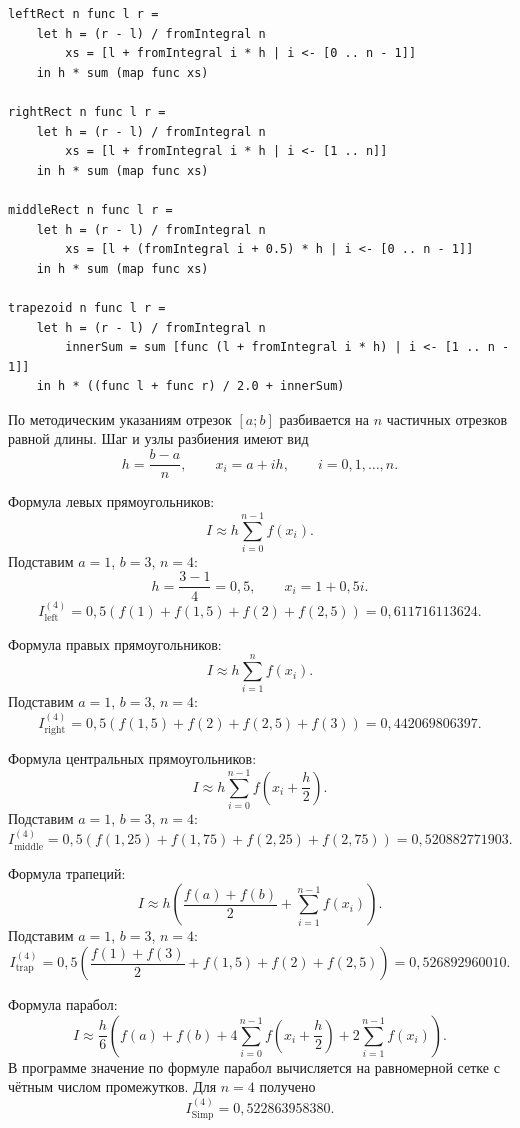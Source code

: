 \documentclass[14pt,a4paper]{extarticle}
\begin{document}
\begin{lstlisting}[caption={Фрагмент кода простейших квадратурных формул}]
leftRect n func l r =
    let h = (r - l) / fromIntegral n
        xs = [l + fromIntegral i * h | i <- [0 .. n - 1]]
    in h * sum (map func xs)

rightRect n func l r =
    let h = (r - l) / fromIntegral n
        xs = [l + fromIntegral i * h | i <- [1 .. n]]
    in h * sum (map func xs)

middleRect n func l r =
    let h = (r - l) / fromIntegral n
        xs = [l + (fromIntegral i + 0.5) * h | i <- [0 .. n - 1]]
    in h * sum (map func xs)

trapezoid n func l r =
    let h = (r - l) / fromIntegral n
        innerSum = sum [func (l + fromIntegral i * h) | i <- [1 .. n - 1]]
    in h * ((func l + func r) / 2.0 + innerSum)
\end{lstlisting}

По методическим указаниям отрезок $[a;b]$ разбивается на $n$ частичных отрезков равной длины. Шаг и узлы разбиения имеют вид
\[
    h=\frac{b-a}{n}, \qquad x_i=a+ih, \qquad i=0,1,\ldots,n.
\]

Формула левых прямоугольников:
\[
    I \approx h\sum_{i=0}^{n-1} f(x_i).
\]
Подставим $a=1$, $b=3$, $n=4$:
\[
    h=\frac{3-1}{4}=0{,}5,
    \qquad x_i=1+0{,}5i.
\]
\[
    I^{(4)}_{\text{left}}
    =0{,}5\left(f(1)+f(1{,}5)+f(2)+f(2{,}5)\right)
    =0{,}611716113624.
\]

Формула правых прямоугольников:
\[
    I \approx h\sum_{i=1}^{n} f(x_i).
\]
Подставим $a=1$, $b=3$, $n=4$:
\[
    I^{(4)}_{\text{right}}
    =0{,}5\left(f(1{,}5)+f(2)+f(2{,}5)+f(3)\right)
    =0{,}442069806397.
\]

Формула центральных прямоугольников:
\[
    I \approx h\sum_{i=0}^{n-1} f\left(x_i+\frac{h}{2}\right).
\]
Подставим $a=1$, $b=3$, $n=4$:
\[
    I^{(4)}_{\text{middle}}
    =0{,}5\left(f(1{,}25)+f(1{,}75)+f(2{,}25)+f(2{,}75)\right)
    =0{,}520882771903.
\]

Формула трапеций:
\[
    I \approx h\left(\frac{f(a)+f(b)}{2}+\sum_{i=1}^{n-1} f(x_i)\right).
\]
Подставим $a=1$, $b=3$, $n=4$:
\[
    I^{(4)}_{\text{trap}}
    =0{,}5\left(\frac{f(1)+f(3)}{2}+f(1{,}5)+f(2)+f(2{,}5)\right)
    =0{,}526892960010.
\]

Формула парабол:
\[
    I \approx \frac{h}{6}\left(f(a)+f(b)+4\sum_{i=0}^{n-1} f\left(x_i+\frac{h}{2}\right)+2\sum_{i=1}^{n-1}f(x_i)\right).
\]
В программе значение по формуле парабол вычисляется на равномерной сетке с чётным числом промежутков. Для $n=4$ получено
\[
    I^{(4)}_{\text{Simp}}=0{,}522863958380.
\]
\end{document}
